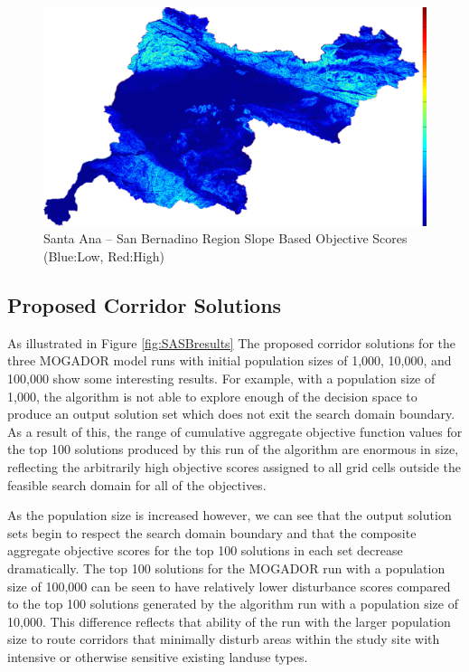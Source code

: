         \begin{figure}[!h]
            \begin{center}
            \includegraphics[width=5.5in]{figures/SanBernadino_SlopeScore.png}   
            \caption{Santa Ana -- San Bernadino Region Slope Based Objective Scores (Blue:Low, Red:High)}
            \label{fig:SASBslope}
            \end{center}
        \end{figure}
        
    \subsection{Proposed Corridor Solutions}
    
As illustrated in Figure \ref{fig:SASBresults} The proposed corridor solutions for the three MOGADOR model runs with initial population sizes of 1,000, 10,000, and 100,000 show some interesting results. For example, with a population size of 1,000, the algorithm is not able to explore enough of the decision space to produce an output solution set which does not exit the search domain boundary. As a result of this, the range of cumulative aggregate objective function values for the top 100 solutions produced by this run of the algorithm are enormous in size, reflecting the arbitrarily high objective scores assigned to all grid cells outside the feasible search domain for all of the objectives. 

As the population size is increased however, we can see that the output solution sets begin to respect the search domain boundary and that the composite aggregate objective scores for the top 100 solutions in each set decrease dramatically. The top 100 solutions for the MOGADOR run with a population size of 100,000 can be seen to have relatively lower disturbance scores compared to the top 100 solutions generated by the algorithm run with a population size of 10,000. This difference reflects that ability of the run with the larger population size to route corridors that minimally disturb areas within the study site with intensive or otherwise sensitive existing landuse types.

